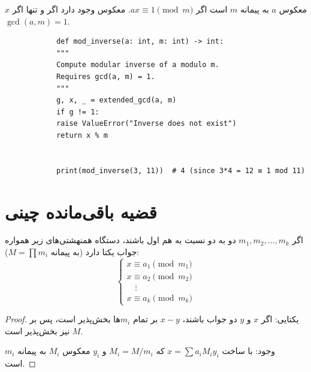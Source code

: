 \documentclass{matinbook}
\begin{document}
    \begin{definition}
        $x$ معکوس $a$ به پیمانه $m$ است اگر
        $ax \equiv 1 \pmod{m}$.
        معکوس وجود دارد اگر و تنها اگر
        $\gcd(a, m) = 1$.
        \label{def:modular-inverse}
    \end{definition}
    
    \begin{latin}
        \begin{verbatim}
            def mod_inverse(a: int, m: int) -> int:
            """
            Compute modular inverse of a modulo m.
            Requires gcd(a, m) = 1.
            """
            g, x, _ = extended_gcd(a, m)
            if g != 1:
            raise ValueError("Inverse does not exist")
            return x % m
            
            
            print(mod_inverse(3, 11))  # 4 (since 3*4 = 12 ≡ 1 mod 11)
        \end{verbatim}
    \end{latin}
    \label{code:mod-inverse}
    
    \section{قضیه باقی‌مانده چینی}
    
    \begin{theorem}
        اگر $m_{1}, m_{2}, \ldots, m_{k}$
        دو به دو نسبت به هم اول باشند،
        دستگاه همنهشتی‌های زیر
        همواره جواب یکتا دارد
        (به پیمانه $M = \prod m_{i}$):
        \[
        \begin{cases}
            x \equiv a_{1} \pmod{m_{1}} \\
            x \equiv a_{2} \pmod{m_{2}} \\
            \quad \vdots \\
            x \equiv a_{k} \pmod{m_{k}}
        \end{cases}
        \]
        \label{thm:crt}
    \end{theorem}
    
    \begin{proof}
        یکتایی: اگر $x$ و $y$ دو جواب باشند،
        $x - y$ بر تمام $m_{i}$ها بخش‌پذیر است،
        پس بر $M$ نیز بخش‌پذیر است.
        
        وجود: با ساخت $x = \sum a_{i} M_{i} y_{i}$
        که $M_{i} = M/m_{i}$ و $y_{i}$ معکوس
        $M_{i}$ به پیمانه $m_{i}$ است.
    \end{proof}
    
\end{document}
